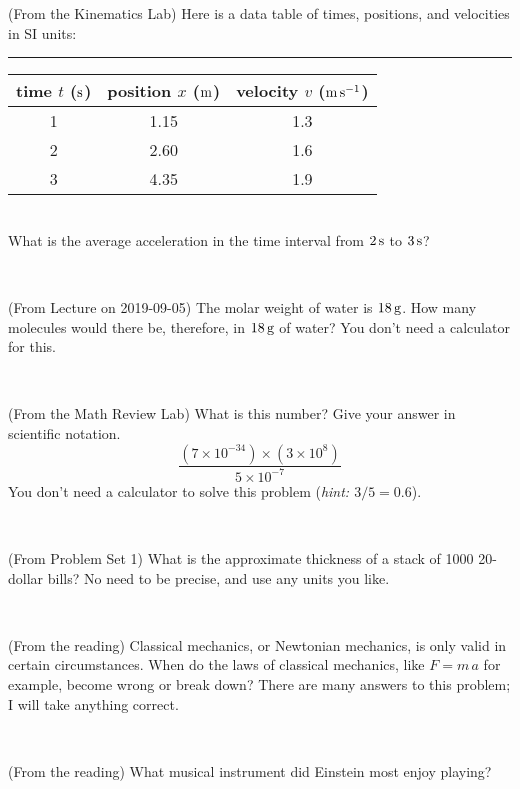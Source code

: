 \documentclass[12pt, letterpaper]{article}
\begin{document}
\begin{problem} (From the Kinematics Lab)
Here is a data table of times, positions, and velocities in SI units:\\
\rule{1.0in}{0pt}\begin{tabular}{c|c|c}
time $t$ ($\mathrm{s}$) & position $x$ ($\mathrm{m}$) & velocity $v$ ($\mathrm{m}\,\mathrm{s}^{-1}$) \\
\hline
1 & 1.15 & 1.3 \\
2 & 2.60 & 1.6 \\
3 & 4.35 & 1.9 \\
\hline
\end{tabular}\\
What is the average acceleration in the time interval from $2\,\mathrm{s}$ to $3\,\mathrm{s}$?
\end{problem}


\vfill ~

\begin{problem} (From Lecture on 2019-09-05)
The molar weight of water is $18\,\mathrm{g}$. How many molecules would there
be, therefore, in $18\,\mathrm{g}$ of water? You don't need a calculator for
this.
\end{problem}


\vfill ~

\begin{problem} (From the Math Review Lab)
What is this number? Give your answer in scientific notation.
$$
\frac{(7\times10^{-34})\times(3\times10^8)}{5\times10^{-7}}
$$
You don't need a calculator to solve this problem (\textit{hint: $3/5=0.6$}).
\end{problem}


\vfill ~


\clearpage


\begin{problem} (From Problem Set 1)
What is the approximate thickness of a stack of 1000 20-dollar bills?
No need to be precise, and use any units you like.
\end{problem}


\vfill ~

\begin{problem} (From the reading)
Classical mechanics, or Newtonian mechanics, is only valid in certain
circumstances. When do the laws of classical mechanics, like $F =
m\,a$ for example, become wrong or break down? There are many answers
to this problem; I will take anything correct.
\end{problem}


\vfill ~

\begin{problem} (From the reading)
What musical instrument did Einstein most enjoy playing?
\end{problem}
\end{document}
